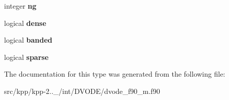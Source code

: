 \begin{DoxyCompactItemize}
\item 
\mbox{\label{structdvode__f90__m_1_1vode__opts_a3799e099993e56489acf10f185e50ff3}} 
integer {\bfseries ng}
\item 
\mbox{\label{structdvode__f90__m_1_1vode__opts_a23a6bdcb70a39fd057cf77ca186b7249}} 
logical {\bfseries dense}
\item 
\mbox{\label{structdvode__f90__m_1_1vode__opts_ad5fa5130f44cc26d9ad0732385cce9f0}} 
logical {\bfseries banded}
\item 
\mbox{\label{structdvode__f90__m_1_1vode__opts_a72eb3868b0c4fd89caef5515c1bb50d3}} 
logical {\bfseries sparse}
\end{DoxyCompactItemize}


The documentation for this type was generated from the following file\+:\begin{DoxyCompactItemize}
\item 
src/kpp/kpp-\/2..\+\_/int/\+D\+V\+O\+D\+E/dvode\+\_\+f90\+\_\+m.\+f90\end{DoxyCompactItemize}
